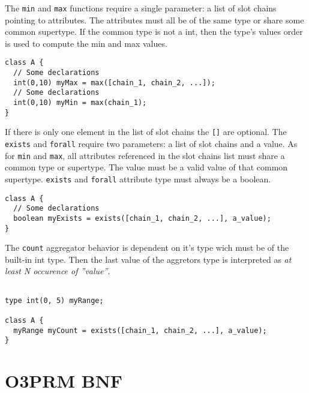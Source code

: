 \documentclass[12pt,a4paper]{article}
\begin{document}
The \verb+min+ and \verb+max+ functions require a single parameter: a list of
slot chains pointing to attributes. The attributes must all be of the same
type or share some common supertype. If the common type is not a int, then the
type's values order is used to compute the min and max values.

\begin{footnotesize}
\begin{verbatim}
class A {
  // Some declarations
  int(0,10) myMax = max([chain_1, chain_2, ...]);
  // Some declarations
  int(0,10) myMin = max(chain_1);
}
\end{verbatim}
\end{footnotesize}

If there is only one element in the list of slot chains the \verb+[]+ are
optional. The \verb+exists+ and \verb+forall+ require two parameters: a list
of slot chains and a value. As for \verb+min+ and \verb+max+, all attributes
referenced in the slot chains list must share a common type or supertype. The
value must be a valid value of that common supertype. \verb+exists+ and
\verb+forall+ attribute type must always be a boolean.

\begin{footnotesize}
\begin{verbatim}
class A {
  // Some declarations
  boolean myExists = exists([chain_1, chain_2, ...], a_value);
}
\end{verbatim}
\end{footnotesize}

The \verb+count+ aggregator behavior is dependent on it's type wich must be of
the built-in int type. Then the last value of the aggretors type is interpreted
as \emph{at least N occurence of ''value''}.

\begin{footnotesize}
\begin{verbatim}

type int(0, 5) myRange;

class A {
  myRange myCount = exists([chain_1, chain_2, ...], a_value);
}
\end{verbatim}
\end{footnotesize}

\newpage
\section{O3PRM BNF}
\end{document}
